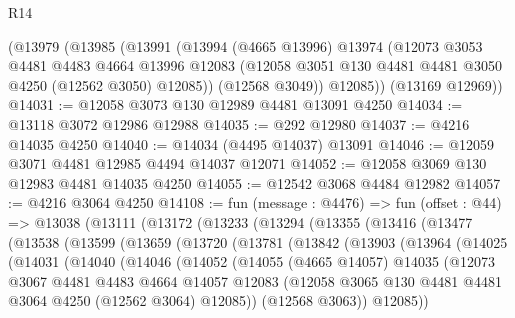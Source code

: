 \begin{lexlean}{R14}
\begin{coremodule}
    (@13979
      (@13985
        (@13991
          (@13994
            (@4665 @13996)
            @13974
            (@12073
              @3053
              @4481
              @4483
              @4664
              @13996
              @12083
              (@12058 @3051 @130 @4481 @4481 @3050 @4250 (@12562 @3050) @12085))
            (@12568 @3049))
          @12085))
      (@13169 @12969))
@14031 := @12058 @3073 @130 @12989 @4481 @13091 @4250
@14034 := @13118 @3072 @12986 @12988
@14035 := @292 @12980
@14037 := @4216 @14035 @4250
@14040 := @14034 (@4495 @14037) @13091
@14046 := @12059 @3071 @4481 @12985 @4494 @14037 @12071
@14052 := @12058 @3069 @130 @12983 @4481 @14035 @4250
@14055 := @12542 @3068 @4484 @12982
@14057 := @4216 @3064 @4250
@14108 := fun (message : @4476) =>
  fun (offset : @44) =>
  @13038
    (@13111
      (@13172
        (@13233
          (@13294
            (@13355
              (@13416
                (@13477
                  (@13538
                    (@13599
                      (@13659
                        (@13720
                          (@13781
                            (@13842
                              (@13903
                                (@13964
                                  (@14025
                                    (@14031
                                      (@14040
                                        (@14046
                                          (@14052
                                            (@14055
                                              (@4665 @14057)
                                              @14035
                                              (@12073
                                                @3067
                                                @4481
                                                @4483
                                                @4664
                                                @14057
                                                @12083
                                                (@12058
                                                  @3065
                                                  @130
                                                  @4481
                                                  @4481
                                                  @3064
                                                  @4250
                                                  (@12562 @3064)
                                                  @12085))
                                              (@12568 @3063))
                                            @12085))

\end{coremodule}
\end{lexlean}

